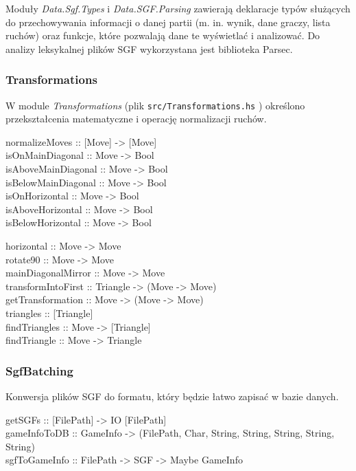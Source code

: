 \documentclass[10pt,leqno]{article}
\newcommand{\cmd}[1]{
  \texttt{#1}
}
\begin{document}
Moduły \emph{Data.Sgf.Types} i \emph{Data.SGF.Parsing} zawierają deklaracje typów służących do 
przechowywania informacji o danej partii (m. in. wynik, dane graczy, lista ruchów) oraz funkcje, które
pozwalają dane te wyświetlać i analizować. Do analizy leksykalnej plików SGF wykorzystana jest
biblioteka Parsec.

\subsubsection{Transformations}
W module \emph{Transformations} (plik \cmd{src/Transformations.hs}) określono przekształcenia matematyczne 
i operację normalizacji ruchów.

\begin{framed}
\noindent normalizeMoves :: [Move] -> [Move] \\

\noindent isOnMainDiagonal :: Move -> Bool  \\
isAboveMainDiagonal :: Move -> Bool \\
isBelowMainDiagonal :: Move -> Bool \\
isOnHorizontal :: Move -> Bool \\
isAboveHorizontal :: Move -> Bool \\
isBelowHorizontal :: Move -> Bool

\noindent horizontal :: Move -> Move \\
rotate90 :: Move -> Move \\
mainDiagonalMirror :: Move -> Move \\

\noindent transformIntoFirst :: Triangle -> (Move -> Move) \\
getTransformation :: Move -> (Move -> Move) \\

\noindent triangles :: [Triangle] \\
findTriangles :: Move -> [Triangle] \\
findTriangle :: Move -> Triangle
\end{framed}

\subsubsection{SgfBatching}
Konwersja plików SGF do formatu, który będzie łatwo zapisać w bazie danych.

\begin{framed}
\noindent getSGFs :: [FilePath] -> IO [FilePath] \\
gameInfoToDB :: GameInfo -> (FilePath, Char, String, String, String, String, String) \\
sgfToGameInfo :: FilePath -> SGF -> Maybe GameInfo
\end{framed}
\end{document}
